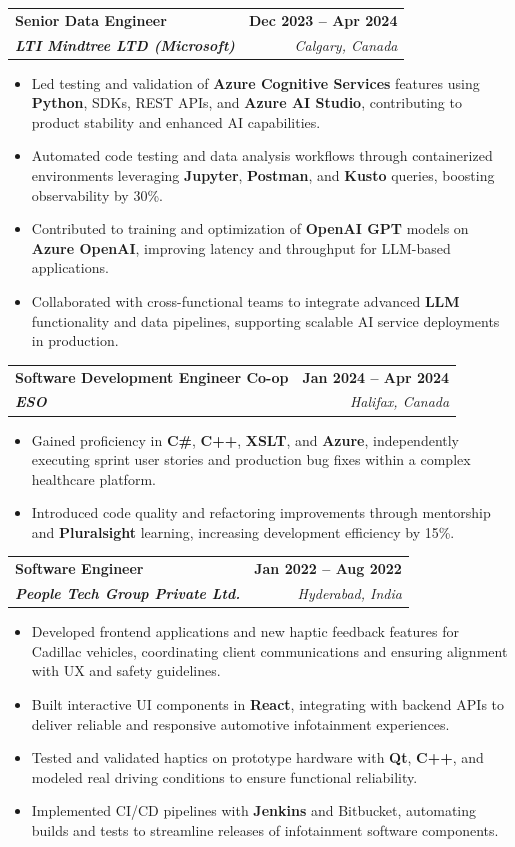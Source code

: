 \documentclass[letterpaper,11pt]{article}
\makeatletter
\newcommand{\resumeItem}[1]{
  \item\small{
    {#1 \vspace{-2pt}}
  }
}
\newcommand{\resumeSubheading}[4]{
  \vspace{-2pt}\item
    \begin{tabular*}{1.0\textwidth}[t]{l@{\extracolsep{\fill}}r}
      \textbf{#1} & \textbf{\small #2} \\
      \textit{\small#3} & \textit{\small #4} \\
    \end{tabular*}\vspace{-7pt}
}
\newcommand{\resumeItemListStart}{\begin{itemize}}
\newcommand{\resumeItemListEnd}{\end{itemize}\vspace{-5pt}}
\makeatother
\begin{document}
    \resumeSubheading
      {\textbf{Senior Data Engineer}}{\textbf{Dec 2023 -- Apr 2024}}
      {\textbf{LTI Mindtree LTD (Microsoft)}}{Calgary, Canada}
      \resumeItemListStart
        \resumeItem{Led testing and validation of \textbf{Azure Cognitive Services} features using \textbf{Python}, SDKs, REST APIs, and \textbf{Azure AI Studio}, contributing to product stability and enhanced AI capabilities.}
        \resumeItem{Automated code testing and data analysis workflows through containerized environments leveraging \textbf{Jupyter}, \textbf{Postman}, and \textbf{Kusto} queries, boosting observability by 30\%.}
        \resumeItem{Contributed to training and optimization of \textbf{OpenAI GPT} models on \textbf{Azure OpenAI}, improving latency and throughput for LLM-based applications.}
        \resumeItem{Collaborated with cross-functional teams to integrate advanced \textbf{LLM} functionality and data pipelines, supporting scalable AI service deployments in production.}
      \resumeItemListEnd
    
    \resumeSubheading
      {\textbf{Software Development Engineer Co-op}}{\textbf{Jan 2024 -- Apr 2024}}
      {\textbf{ESO}}{Halifax, Canada}
      \resumeItemListStart
        \resumeItem{Gained proficiency in \textbf{C\#}, \textbf{C++}, \textbf{XSLT}, and \textbf{Azure}, independently executing sprint user stories and production bug fixes within a complex healthcare platform.}
        \resumeItem{Introduced code quality and refactoring improvements through mentorship and \textbf{Pluralsight} learning, increasing development efficiency by 15\%.}
      \resumeItemListEnd

    \resumeSubheading
      {\textbf{Software Engineer}}{\textbf{Jan 2022 -- Aug 2022}}
      {\textbf{People Tech Group Private Ltd.}}{Hyderabad, India}
      \resumeItemListStart
        \resumeItem{Developed frontend applications and new haptic feedback features for Cadillac vehicles, coordinating client communications and ensuring alignment with UX and safety guidelines.}
        \resumeItem{Built interactive UI components in \textbf{React}, integrating with backend APIs to deliver reliable and responsive automotive infotainment experiences.}
        \resumeItem{Tested and validated haptics on prototype hardware with \textbf{Qt}, \textbf{C++}, and modeled real driving conditions to ensure functional reliability.}
        \resumeItem{Implemented CI/CD pipelines with \textbf{Jenkins} and Bitbucket, automating builds and tests to streamline releases of infotainment software components.}
      \resumeItemListEnd
\end{document}
